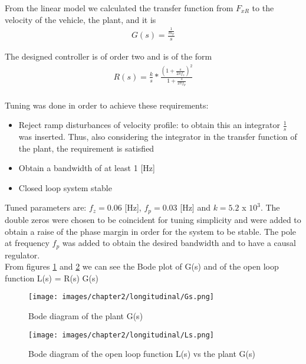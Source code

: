 \documentclass{report}
\begin{document}
From the linear model we calculated the transfer function from $F_{xR}$ to the velocity of the vehicle, the plant, and it is
\begin{equation*}
\begin{aligned}
G(s) = \frac{\frac{1}{m_T}}{s}
\end{aligned}
\end{equation*}

The designed controller is of order two and is of the form
\begin{equation*}
\begin{aligned}
R(s) = \frac{k}{s} * \frac{(1 + \frac{s}{2 \pi f_z})^2}{1 + \frac{s}{2 \pi f_p}}
\end{aligned}
\end{equation*}
\\Tuning was done in order to achieve these requirements:
\begin{itemize}
    \item Reject ramp disturbances of velocity profile: to obtain this an integrator $\frac{1}{s}$ was inserted. Thus, also considering the integrator in the transfer function of the plant, the requirement is satisfied
    
    \item Obtain a bandwidth of at least 1 [Hz]
    
    \item Closed loop system stable
\end{itemize}
Tuned parameters are: $f_z = 0.06$ [Hz], $f_p = 0.03$ [Hz] and $k = 5.2$ x $10^3$. The double zeros were chosen to be coincident for tuning simplicity and were added to obtain a raise of the phase margin in order for the system to be stable. The pole at frequency $f_p$ was added to obtain the desired bandwidth and to have a causal regulator.
\\From figures \ref{fig:longController_Gs} and \ref{fig:longController_Ls} we can see the Bode plot of G(s) and of the open loop function L(s) = R(s) G(s)

\begin{figure}[h!]
    \centering
    \texttt{[image: images/chapter2/longitudinal/Gs.png]}
    \caption{Bode diagram of the plant G(s)}
    \label{fig:longController_Gs}
\end{figure}

\begin{figure}[h!]
    \centering
    \texttt{[image: images/chapter2/longitudinal/Ls.png]}
    \caption{Bode diagram of the open loop function L(s) vs the plant G(s)}
    \label{fig:longController_Ls}
\end{figure}
\end{document}

